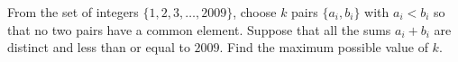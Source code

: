 From the set of integers $ \{1,2,3,\ldots,2009\}$, choose $ k$ pairs $ \{a_i,b_i\}$ with $ a_i<b_i$ so that no two pairs have a common element. Suppose that all the sums $ a_i+b_i$ are distinct and less than or equal to $ 2009$. Find the maximum possible value of $ k$.